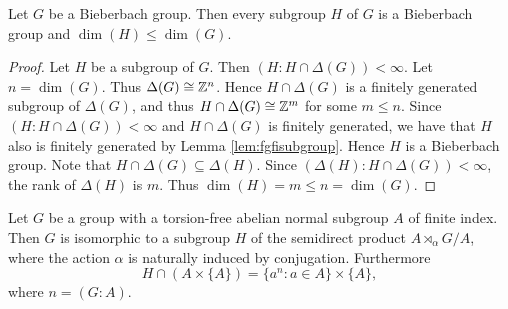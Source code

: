 \begin{lemma}\label{lem:SubBieberbeach}
Let $G$ be a Bieberbach group. Then every subgroup $H$ of $G$ is a Bieberbach group and $\dim(H)\leq\dim(G)$.
\end{lemma}

\begin{proof}
Let $H$ be a subgroup of $G$. Then $(H: H\cap\Delta(G))<\infty$. Let $n=\dim(G)$. Thus $\Delta(G)\cong \mathbb{Z}^n$. Hence $H\cap\Delta(G)$ is a finitely generated subgroup of $\Delta(G)$, and thus $H\cap \Delta(G)\cong\mathbb{Z}^m$ for some $m\leq n$. Since $(H:H\cap\Delta(G))<\infty$ and $H\cap\Delta(G)$ is finitely generated, we have that $H$ also is finitely generated by Lemma \ref{lem:fgfisubgroup}. Hence $H$ is a Bieberbach group. Note that $H\cap\Delta(G)\subseteq \Delta(H)$. Since $(\Delta(H):H\cap\Delta(G))<\infty$, the rank of $\Delta(H)$ is $m$. Thus $\dim(H)=m\leq n=\dim(G)$.  
\end{proof}

\begin{lemma}\label{lem:semidirectBieberbach}
Let $G$ be a group with a torsion-free abelian normal subgroup $A$ of finite index. Then $G$ is isomorphic to a subgroup $H$ of the semidirect product $A\rtimes_{\alpha}G/A$, where the action $\alpha$ is naturally induced by conjugation. Furthermore
\[ H\cap (A\times\{ A\})=\{a^n : a\in A\}\times\{ A\},\]
where $n=(G:A)$.
\end{lemma}

